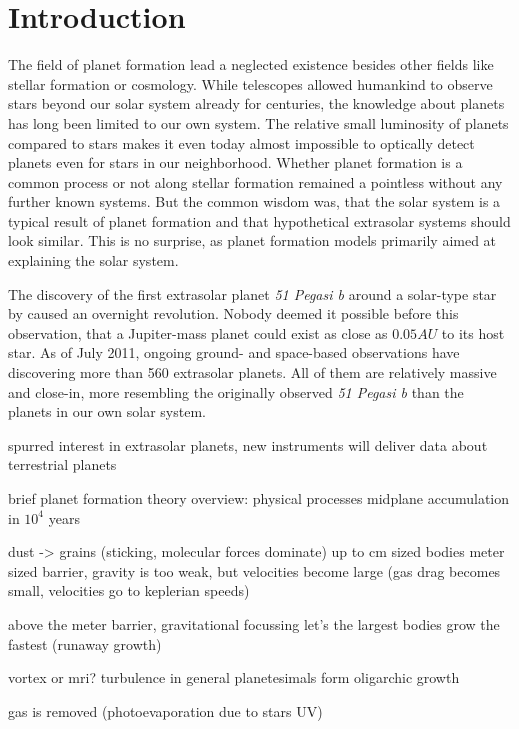 \cleardoublepage
\chapter{Introduction}
\label{ch01}
The field of planet formation lead a neglected existence besides other fields like stellar formation or cosmology. While telescopes allowed humankind to observe stars beyond our solar system already for centuries, the knowledge about planets has long been limited to our own system. The relative small luminosity of planets compared to stars makes it even today almost impossible to optically detect planets even for stars in our neighborhood. Whether planet formation is a common process or not along stellar formation remained a pointless without any further known systems. But the common wisdom was, that the solar system is a typical result of planet formation and that hypothetical extrasolar systems should look similar. This is no surprise, as planet formation models primarily aimed at explaining the solar system.

The discovery of the first extrasolar planet \emph{51 Pegasi b} around a solar-type star by \cite{1995Natur.378..355M} caused an overnight revolution. Nobody deemed it possible before this observation, that a Jupiter-mass planet could exist as close as $0.05 AU$ to its host star. As of July 2011, ongoing ground- and space-based observations have discovering more than 560 extrasolar planets. All of them are relatively massive and close-in, more resembling the originally observed \emph{51 Pegasi b} than the planets in our own solar system.



spurred interest in extrasolar planets, new instruments will deliver data about terrestrial planets

brief planet formation theory overview: physical processes 
midplane accumulation in $10^4$ years

dust -> grains (sticking, molecular forces dominate) up to cm sized bodies
meter sized barrier, gravity is too weak, but velocities become large (gas drag becomes small, velocities go to keplerian speeds)
\cite{Benz1999Icar..142....5B}

above the meter barrier, gravitational focussing let's the largest bodies grow the fastest (runaway growth)

vortex or mri? \cite{Johansen:2007p37} turbulence in general \citep{2008ApJ...686.1292I} planetesimals form
oligarchic growth

gas is removed (photoevaporation due to stars UV)

